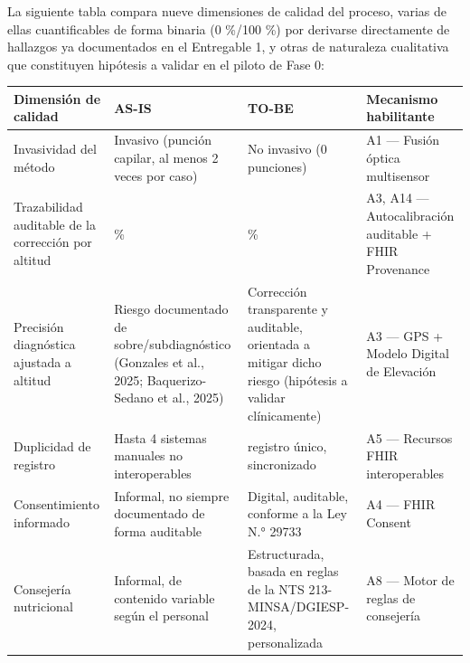 \documentclass[11pt,a4paper]{article}
\begin{document}
La siguiente tabla compara nueve dimensiones de calidad del proceso, varias de ellas cuantificables de forma binaria (0 \%/100 \%) por derivarse directamente de hallazgos ya documentados en el Entregable 1, y otras de naturaleza cualitativa que constituyen hipótesis a validar en el piloto de Fase 0:

{\small
\begin{longtable}[]{@{}
  >{\raggedright\arraybackslash}p{}
  >{\raggedright\arraybackslash}p{}
  >{\raggedright\arraybackslash}p{}
  >{\raggedright\arraybackslash}p{}@{}}
\toprule\noalign{}
\begin{minipage}[b]{\linewidth}\raggedright
Dimensión de calidad
\end{minipage} & \begin{minipage}[b]{\linewidth}\raggedright
AS-IS
\end{minipage} & \begin{minipage}[b]{\linewidth}\raggedright
TO-BE
\end{minipage} & \begin{minipage}[b]{\linewidth}\raggedright
Mecanismo habilitante
\end{minipage} \\
\midrule\noalign{}
\endhead
\bottomrule\noalign{}
\endlastfoot
Invasividad del método & Invasivo (punción capilar, al menos 2 veces por caso) & No invasivo (0 punciones) & A1 --- Fusión óptica multisensor \\
Trazabilidad auditable de la corrección por altitud & 0 \% & 100 \% & A3, A14 --- Autocalibración auditable + FHIR Provenance \\
Precisión diagnóstica ajustada a altitud & Riesgo documentado de sobre/subdiagnóstico (Gonzales et al., 2025; Baquerizo-Sedano et al., 2025) & Corrección transparente y auditable, orientada a mitigar dicho riesgo (hipótesis a validar clínicamente) & A3 --- GPS + Modelo Digital de Elevación \\
Duplicidad de registro & Hasta 4 sistemas manuales no interoperables & 1 registro único, sincronizado & A5 --- Recursos FHIR interoperables \\
Consentimiento informado & Informal, no siempre documentado de forma auditable & Digital, auditable, conforme a la Ley N.° 29733 & A4 --- FHIR Consent \\
Consejería nutricional & Informal, de contenido variable según el personal & Estructurada, basada en reglas de la NTS 213-MINSA/DGIESP-2024, personalizada & A8 --- Motor de reglas de consejería \\

\end{longtable}}
\end{document}
